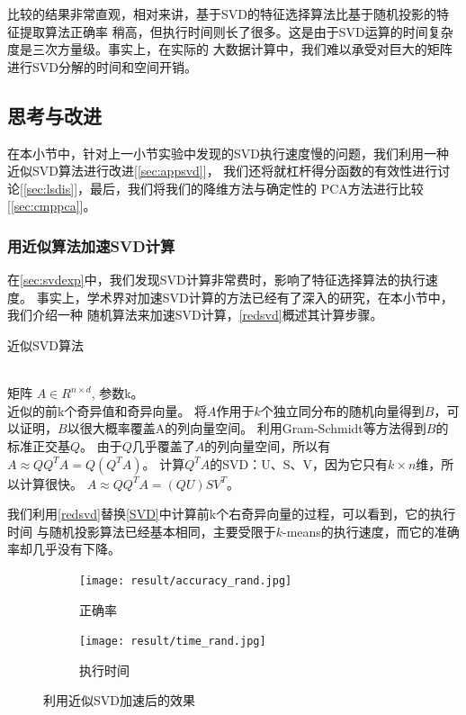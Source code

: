 \documentclass{ctexart}
\begin{document}
        比较的结果非常直观，相对来讲，基于SVD的特征选择算法比基于随机投影的特征提取算法正确率
        稍高，但执行时间则长了很多。这是由于SVD运算的时间复杂度是三次方量级。事实上，在实际的
        大数据计算中，我们难以承受对巨大的矩阵进行SVD分解的时间和空间开销\cite{blum2020foundations,halko2011finding,halko2011finding}。
    
    \subsection{思考与改进}
    在本小节中，针对上一小节实验中发现的SVD执行速度慢的问题，我们利用一种近似SVD算法进行改进[\autoref{sec:appsvd}]，
    我们还将就杠杆得分函数的有效性进行讨论[\autoref{sec:lsdis}]，最后，我们将我们的降维方法与确定性的
    PCA方法进行比较[\autoref{sec:cmppca}]。

    \subsubsection{用近似算法加速SVD计算}
    \label{sec:appsvd}
    在\autoref{sec:svdexp}中，我们发现SVD计算非常费时，影响了特征选择算法的执行速度。
    事实上，学术界对加速SVD计算的方法已经有了深入的研究\cite{halko2011finding}，在本小节中，我们介绍一种
    随机算法来加速SVD计算\cite{szlam2014implementation}，\autoref{redsvd}概述其计算步骤。
    \begin{algorithm}[h]
    \caption{近似SVD算法}
    \label{redsvd}
        \begin{algorithmic}[1] %
        \REQUIRE ~~\\ %
            矩阵 $ A \in R^{n \times d}$, 参数k。
        \ENSURE ~~\\ %
            近似的前k个奇异值和奇异向量。
        \STATE 将$A$作用于$k$个独立同分布的随机向量得到$B$，可以证明，$B$以很大概率覆盖A的列向量空间\cite{halko2011finding}。
        \STATE 利用Gram-Schmidt等方法得到$B$的标准正交基$Q$。
        \STATE 由于$Q$几乎覆盖了$A$的列向量空间，所以有$A \approx Q Q^T A = Q (Q^T A)$。
        \STATE 计算$Q^T A$的SVD：U、S、V，因为它只有$k \times n$维，所以计算很快。
        \STATE $A \approx Q Q^T A = (QU) S V^T$。
        \end{algorithmic}
    \end{algorithm}

    我们利用\autoref{redsvd}替换\autoref{SVD}中计算前k个右奇异向量的过程，可以看到，它的执行时间
    与随机投影算法已经基本相同，主要受限于$k$-means的执行速度，而它的准确率却几乎没有下降。
    \begin{figure}[H]
        \centering
        \begin{subfigure}{.5\textwidth}
            \centering
            \texttt{[image: result/accuracy\_rand.jpg]}
            \caption{正确率}
        \end{subfigure}%
        \begin{subfigure}{.5\textwidth}
            \centering
            \texttt{[image: result/time\_rand.jpg]}
            \caption{执行时间}
        \end{subfigure}
        \caption{利用近似SVD加速后的效果}
        \label{fig:3cmp}
    \end{figure}
\end{document}
